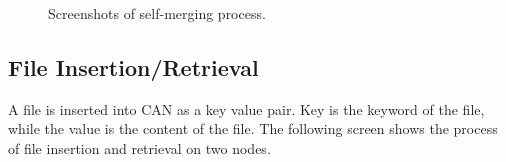 \documentclass[11pt, oneside]{article}   	%
\begin{document}
\begin{figure}[htbp] %
   \centering
   \caption{Screenshots of self-merging process.}
   \label{fig:screenshot}
\end{figure} 

\subsection{File Insertion/Retrieval}
A file is inserted into CAN as a key value pair. Key is the keyword of the file, while the value is the content of the file. The following screen shows the process of file insertion and retrieval on two nodes.
\end{document}
